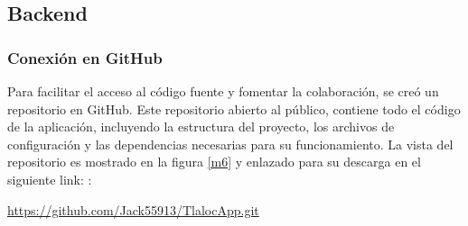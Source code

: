 

\subsection{Backend}

\subsubsection{Conexión en GitHub}
Para facilitar el acceso al código fuente y fomentar la colaboración, se creó un repositorio en GitHub. Este repositorio abierto al público, contiene todo el código de la aplicación, incluyendo la estructura del proyecto, los archivos de configuración y las dependencias necesarias para su funcionamiento. La vista del repositorio es mostrado en la figura \ref{m6} y enlazado para su descarga en el siguiente link:
: 
\begin{center}
  \url{https://github.com/Jack55913/TlalocApp.git}
\end{center}


